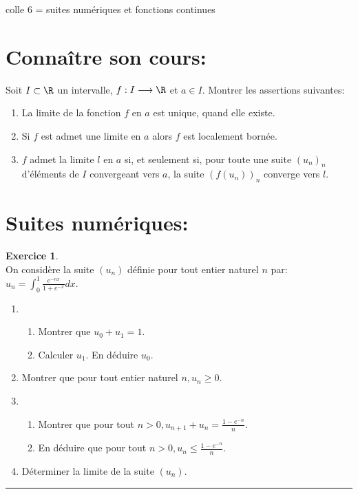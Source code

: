 \documentclass[a4paper,11pt]{article}
\theoremstyle{definition}
\newtheorem{exo}{Exercice} %
\begin{document}
	
	
	\begin{center}
		\Large \sc colle 6 = suites numériques et fonctions continues
	\end{center}
\raggedright

\section*{Connaître son cours:}
Soit $I\subset\R$ un intervalle, $f: I \longrightarrow \R$ et $a\in I$. Montrer les assertions suivantes:
\begin{enumerate}
	\item  La limite de la fonction $f$ en $a$ est unique, quand elle existe.
	\item Si $f$ est admet une limite en $a$ alors $f$ est localement bornée. 
	\item  $f$ admet la limite $l$ en $a$ si,
	et seulement si, pour toute une suite $(u_n )_n$ d'éléments de $I$ convergeant vers $a$, la suite $(f (u_n ))_n$ converge vers $l$. 
\end{enumerate}


	\section*{Suites numériques:}

	\begin{exo}\textit{}\quad\\[0.25cm]

	On considère la suite $\left(u_{n}\right)$ définie pour tout entier naturel $n$ par:\quad  $ u_{n}=\int_{0}^{1} \frac{e^{-n x}}{1+e^{-x}} d x .
	$
	
\begin{enumerate}
\item\begin{enumerate}
	\item Montrer que $u_{0}+u_{1}=1$.
	\item Calculer $u_{1}$. En déduire $u_{0}$.
\end{enumerate}
\item Montrer que pour tout entier naturel $n, u_{n} \geq 0$.
\item 
\begin{enumerate}
	\item Montrer que pour tout $n>0, u_{n+1}+u_{n}=\frac{1-e^{-n}}{n}$.
	\item En déduire que pour tout $n>0, u_{n} \leq \frac{1-e^{-n}}{n}$.
\end{enumerate}
\item Déterminer la limite de la suite $\left(u_{n}\right)$.
\end{enumerate}

	\centering
	\rule{1\linewidth}{0.6pt}
\end{exo}
\end{document}
